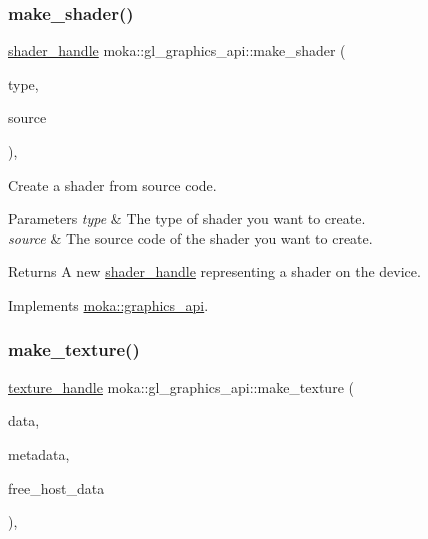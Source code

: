 \subsubsection{\texorpdfstring{make\_shader()}{make\_shader()}}
{\footnotesize\ttfamily \mbox{\hyperlink{structmoka_1_1shader__handle}{shader\+\_\+handle}} moka\+::gl\+\_\+graphics\+\_\+api\+::make\+\_\+shader (\begin{DoxyParamCaption}\item[{\mbox{\hyperlink{namespacemoka_a472008f32e5db526d38eace7d3e45772}{shader\+\_\+type}}}]{type,  }\item[{const std\+::string \&}]{source }\end{DoxyParamCaption})\hspace{0.3cm}{\ttfamily [override]}, {\ttfamily [virtual]}}



Create a shader from source code. 


\begin{DoxyParams}{Parameters}
{\em type} & The type of shader you want to create. \\
\hline
{\em source} & The source code of the shader you want to create. \\
\hline
\end{DoxyParams}
\begin{DoxyReturn}{Returns}
A new \mbox{\hyperlink{structmoka_1_1shader__handle}{shader\+\_\+handle}} representing a shader on the device. 
\end{DoxyReturn}


Implements \mbox{\hyperlink{classmoka_1_1graphics__api_ad1dd3ca0c1bd1477d2f40d3fae8b1956}{moka\+::graphics\+\_\+api}}.

\mbox{\label{classmoka_1_1gl__graphics__api_aeb20d721d419ee141f0dc64669f2d973}} 
\subsubsection{\texorpdfstring{make\_texture()}{make\_texture()}}
{\footnotesize\ttfamily \mbox{\hyperlink{structmoka_1_1texture__handle}{texture\+\_\+handle}} moka\+::gl\+\_\+graphics\+\_\+api\+::make\+\_\+texture (\begin{DoxyParamCaption}\item[{void $\ast$$\ast$}]{data,  }\item[{\mbox{\hyperlink{structmoka_1_1texture__metadata}{texture\+\_\+metadata}} \&\&}]{metadata,  }\item[{bool}]{free\+\_\+host\+\_\+data }\end{DoxyParamCaption})\hspace{0.3cm}{\ttfamily [override]}, {\ttfamily [virtual]}}



